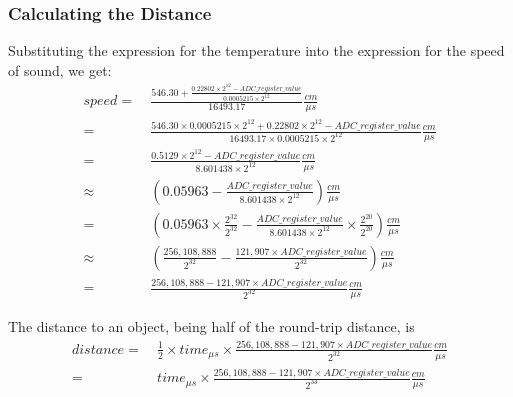 \subsubsection{Calculating the Distance}

Substituting the expression for the temperature into the expression for the speed of sound, we get:
\begin{align*}
    speed   = &\ \frac{546.30 + \frac{0.22802 \times 2^{12} - ADC\_register\_value}{0.0005215 \times 2^{12}}}{16493.17} \frac{cm}{\mu s}                                        \\
            = &\ \frac{546.30 \times 0.0005215 \times 2^{12} + 0.22802 \times 2^{12} - ADC\_register\_value}{16493.17 \times 0.0005215 \times 2^{12}} \frac{cm}{\mu s}          \\
            = &\ \frac{0.5129 \times 2^{12} - ADC\_register\_value}{8.601438 \times 2^{12}} \frac{cm}{\mu s}                                                                    \\
      \approx &\ \left(0.05963 - \frac{ADC\_register\_value}{8.601438 \times 2^{12}} \right) \frac{cm}{\mu s}                                                                   \\
            = &\ \left(0.05963 \times \frac{2^{32}}{2^{32}}    -    \frac{ADC\_register\_value}{8.601438 \times 2^{12}} \times \frac{2^{20}}{2^{20}} \right) \frac{cm}{\mu s}   \\
      \approx &\ \left( \frac{256,108,888}{2^{32}} - \frac{121,907 \times ADC\_register\_value}{2^{32}} \right) \frac{cm}{\mu s}                                                \\
            = &\ \frac{256,108,888 - 121,907 \times ADC\_register\_value}{2^{32}} \frac{cm}{\mu s}
\end{align*}

The distance to an object, being half of the round-trip distance, is
\begin{align*}
    distance = &\ \frac{1}{2} \times time_{\mu s} \times \frac{256,108,888 - 121,907 \times ADC\_register\_value}{2^{32}} \frac{cm}{\mu s}  \\
             = &\ time_{\mu s} \times  \frac{256,108,888 - 121,907 \times ADC\_register\_value}{2^{33}} \frac{cm}{\mu s}
\end{align*}